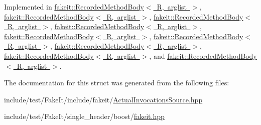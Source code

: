 Implemented in \mbox{\hyperlink{classfakeit_1_1RecordedMethodBody_a6164a16c7813da2b7cd0d46568f1f1bc}{fakeit\+::\+Recorded\+Method\+Body$<$ R, arglist $>$}}, \mbox{\hyperlink{classfakeit_1_1RecordedMethodBody_a6164a16c7813da2b7cd0d46568f1f1bc}{fakeit\+::\+Recorded\+Method\+Body$<$ R, arglist $>$}}, \mbox{\hyperlink{classfakeit_1_1RecordedMethodBody_a6164a16c7813da2b7cd0d46568f1f1bc}{fakeit\+::\+Recorded\+Method\+Body$<$ R, arglist $>$}}, \mbox{\hyperlink{classfakeit_1_1RecordedMethodBody_a6164a16c7813da2b7cd0d46568f1f1bc}{fakeit\+::\+Recorded\+Method\+Body$<$ R, arglist $>$}}, \mbox{\hyperlink{classfakeit_1_1RecordedMethodBody_a6164a16c7813da2b7cd0d46568f1f1bc}{fakeit\+::\+Recorded\+Method\+Body$<$ R, arglist $>$}}, \mbox{\hyperlink{classfakeit_1_1RecordedMethodBody_a6164a16c7813da2b7cd0d46568f1f1bc}{fakeit\+::\+Recorded\+Method\+Body$<$ R, arglist $>$}}, \mbox{\hyperlink{classfakeit_1_1RecordedMethodBody_a6164a16c7813da2b7cd0d46568f1f1bc}{fakeit\+::\+Recorded\+Method\+Body$<$ R, arglist $>$}}, \mbox{\hyperlink{classfakeit_1_1RecordedMethodBody_a6164a16c7813da2b7cd0d46568f1f1bc}{fakeit\+::\+Recorded\+Method\+Body$<$ R, arglist $>$}}, and \mbox{\hyperlink{classfakeit_1_1RecordedMethodBody_a6164a16c7813da2b7cd0d46568f1f1bc}{fakeit\+::\+Recorded\+Method\+Body$<$ R, arglist $>$}}.



The documentation for this struct was generated from the following files\+:\begin{DoxyCompactItemize}
\item 
include/test/\+Fake\+It/include/fakeit/\mbox{\hyperlink{ActualInvocationsSource_8hpp}{Actual\+Invocations\+Source.\+hpp}}\item 
include/test/\+Fake\+It/single\+\_\+header/boost/\mbox{\hyperlink{single__header_2boost_2fakeit_8hpp}{fakeit.\+hpp}}\end{DoxyCompactItemize}
